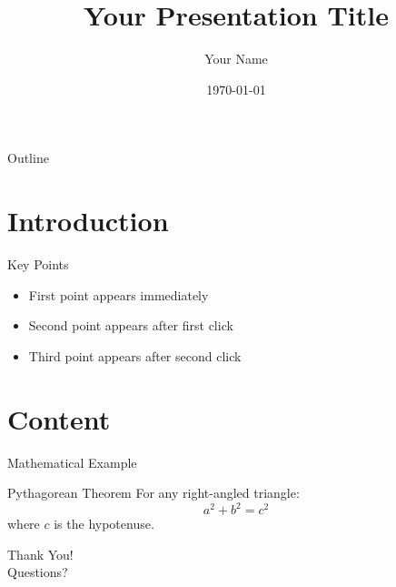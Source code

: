 \documentclass{beamer}
\title{Your Presentation Title}
\author{Your Name}
\institute{Your Institution}
\date{\today}
\begin{document}
\begin{frame}
  \titlepage
\end{frame}

\begin{frame}{Outline}
  \tableofcontents
\end{frame}

\section{Introduction}

\begin{frame}{Key Points}
  \begin{itemize}
    \item First point appears immediately
    \item \pause Second point appears after first click
    \item \pause Third point appears after second click
  \end{itemize}
\end{frame}

\section{Content}

\begin{frame}{Mathematical Example}
  \begin{block}{Pythagorean Theorem}
    For any right-angled triangle:
    \[
      a^2 + b^2 = c^2
    \]
    where \(c\) is the hypotenuse.
  \end{block}
\end{frame}

\begin{frame}
  \begin{center}
    \Huge Thank You! \\
    \vspace{1em}
    \large Questions?
  \end{center}
\end{frame}
\end{document}
